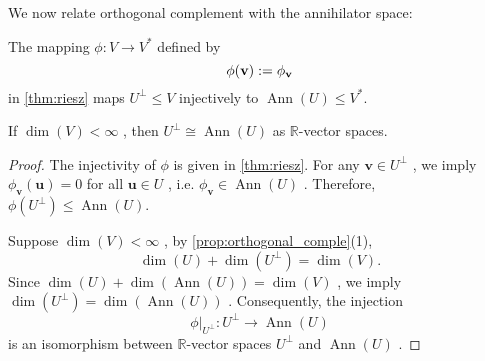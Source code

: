 We now relate orthogonal complement with the annihilator space:
\begin{proposition} The mapping \(\phi  : V \rightarrow  {V}^*\) defined by
$$\phi({\bf v}) := \phi_{\bf v}$$
in \autoref{thm:riesz} maps \({U}^{\perp} \leq  V\) injectively to \(\operatorname{Ann}\left( U\right)  \leq  {V}^*\). 

If \(\dim \left( V\right)  < \infty\) , then \({U}^{\perp} \cong  \operatorname{Ann}\left( U\right)\) as \(\mathbb{R}\)-vector spaces.
\end{proposition}

\begin{proof} The injectivity of \(\phi\) is given in \autoref{thm:riesz}. For any \(\mathbf{v} \in  {U}^{\perp}\) , we imply \({\phi }_{\mathbf{v}}\left( \mathbf{u}\right)  = 0\) for all \(\mathbf{u} \in  U\) , i.e. \({\phi }_{\mathbf{v}} \in  \operatorname{Ann}\left( U\right)\) . Therefore, \(\phi \left( {U}^{\perp}\right)  \leq  \operatorname{Ann}\left( U\right)\).

\medskip
Suppose \(\dim \left( V\right)  < \infty\) , by \autoref{prop:orthogonal_comple}(1),
\[
\dim \left( U\right)  + \dim \left( {U}^{\perp}\right)  = \dim \left( V\right).
\]
Since \(\dim \left( U\right)  + \dim \left( {\operatorname{Ann}\left( U\right) }\right)  = \dim \left( V\right)\) , we imply \(\dim \left( {U}^{\perp}\right)  = \dim \left( {\operatorname{Ann}\left( U\right) }\right)\) .
Consequently, the injection
\[
\phi|_{U^{\perp}}  : {U}^{\perp} \rightarrow  \operatorname{Ann}\left( U\right)
\]
is an isomorphism between \(\mathbb{R}\)-vector spaces \({U}^{\perp}\) and \(\operatorname{Ann}\left( U\right)\) .
\end{proof}